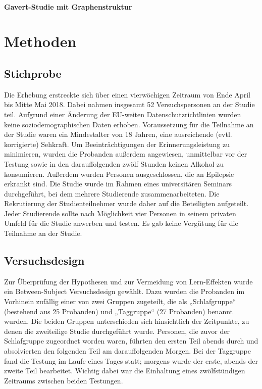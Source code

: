 \documentclass[preprint,12pt]{elsarticle}
\begin{document}
\paragraph{Gavert-Studie mit Graphenstruktur}

\section{Methoden}
\label{S:2}

\subsection{Stichprobe}
Die Erhebung erstreckte sich über einen vierwöchigen Zeitraum von Ende April bis Mitte Mai 2018. Dabei nahmen insgesamt 52 Versuchspersonen an der Studie teil. Aufgrund einer Änderung der  EU-weiten Datenschutzrichtlinien wurden keine soziodemographischen Daten erhoben. Voraussetzung für die Teilnahme an der Studie waren ein Mindestalter von 18 Jahren, eine ausreichende (evtl. korrigierte) Sehkraft. Um Beeinträchtigungen der Erinnerungsleistung zu minimieren, wurden die Probanden außerdem angewiesen, unmittelbar vor der Testung sowie in den darauffolgenden zwölf Stunden keinen Alkohol zu konsumieren. Außerdem wurden Personen ausgeschlossen, die an Epilepsie erkrankt sind.
Die Studie wurde im Rahmen eines universitären Seminars durchgeführt, bei dem mehrere Studierende zusammenarbeiteten. Die Rekrutierung der Studienteilnehmer wurde daher auf die Beteiligten aufgeteilt. Jeder Studierende sollte nach Möglichkeit vier Personen in seinem privaten Umfeld für die Studie anwerben und testen. Es gab keine Vergütung für die Teilnahme an der Studie.

\subsection{Versuchsdesign}
Zur Überprüfung der Hypothesen und zur Vermeidung von Lern-Effekten wurde ein Between-Subject Versuchsdesign gewählt. Dazu wurden die Probanden im Vorhinein zufällig einer von zwei Gruppen zugeteilt, die als „Schlafgruppe“ (bestehend aus 25 Probanden) und „Taggruppe“ (27 Probanden) benannt wurden. Die beiden Gruppen unterschieden sich hinsichtlich der Zeitpunkte, zu denen die zweiteilige Studie durchgeführt wurde. Personen, die zuvor der Schlafgruppe zugeordnet worden waren, führten den ersten Teil abends durch und absolvierten den folgenden Teil am darauffolgenden Morgen. Bei der Taggruppe fand die Testung im Laufe eines Tages statt; morgens wurde der erste, abends der zweite Teil bearbeitet. Wichtig dabei war die Einhaltung eines zwölfstündigen Zeitraums zwischen beiden Testungen.
\end{document}

